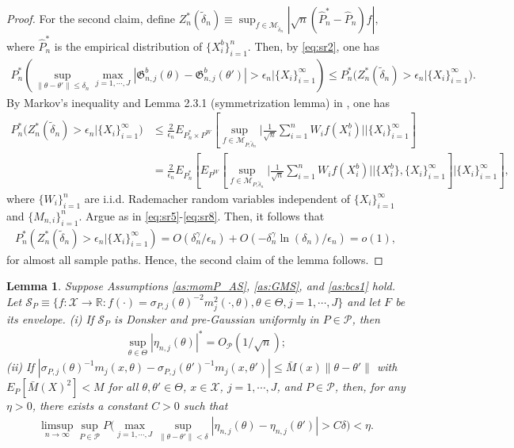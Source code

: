 \documentclass[letterpaper,11pt]{article}
\theoremstyle{myplain}
\newtheorem{lemma}{Lemma}[section]
\theoremstyle{mydefinition}
\theoremstyle{myremark}
\renewcommand{\cite}{\citet}
\numberwithin{equation}{section}
\numberwithin{figure}{section}
\begin{document}
\begin{appendices}
\begin{proof}
For the second claim, define $Z^*_n(\tilde\delta_n)\equiv \sup_{f\in\mathcal M_{\tilde\delta_n}}|\sqrt n(\hat P^*_n-\hat P_n)f|,$ where $\hat P^*_n$ is the empirical distribution of $\{X_i^b\}_{i=1}^n$. Then, by \eqref{eq:sr2}, one has
\begin{align}
P^*_n\left(\sup_{\|\theta-\theta'\|\le \delta_n}\max_{j=1,\cdots,J}|\mathfrak G^b_{n,j}(\theta)-\mathfrak G^b_{n,j}(\theta')|>\epsilon_n\Big|\{X_i\}_{i=1}^\infty\right)\le P^*_n\big(Z^*_n(\tilde\delta_n)>\epsilon_n\big|\{X_i\}_{i=1}^\infty\big).\label{eq:sr9}	
\end{align}
By Markov's inequality and Lemma 2.3.1 (symmetrization lemma) in \cite{Vaart_Wellner2000aBK}, one has
\begin{align}
P^*_n\big(Z^*_n(\tilde\delta_n)>\epsilon_n\big|\{X_i\}_{i=1}^\infty\big)&\le \frac{2}{\epsilon_n}E_{P^*_n\times P^W}\left[\sup_{f\in\mathcal M_{P,\tilde\delta_n}}\Big|\frac{1}{\sqrt n}\sum_{i=1}^nW_i f(X^b_i)\Big| \Bigg|\{X_i\}_{i=1}^\infty\right]\\
&=\frac{2}{\epsilon_n}E_{P^*_n}\left[E_{P^W}\left[\sup_{f\in\mathcal M_{P,\tilde\delta_n}}\Big| \frac{1}{\sqrt n}\sum_{i=1}^nW_i f(X^b_i)\Big| \Bigg|\{X^b_i\},\{X_i\}_{i=1}^\infty\right]\Bigg|\{X_i\}_{i=1}^\infty\right],\label{eq:sr10}
\end{align}
where $\{W_i\}_{i=1}^n$ are i.i.d. Rademacher random variables independent of $\{X_i\}_{i=1}^\infty$ and $\{M_{n,i}\}_{i=1}^n$.
Argue as in \eqref{eq:sr5}-\eqref{eq:sr8}. Then, it follows that
\begin{align*}
P^*_n(Z^*_n(\tilde\delta_n)>\epsilon_n|\{X_i\}_{i=1}^\infty)=O(\delta_n^\gamma/\epsilon_n)+O(-\delta_n^\gamma\ln(\delta_n)/\epsilon_n)=o(1),
\end{align*}
 for almost all sample paths. Hence, the second claim of the lemma follows.
\end{proof}



\begin{lemma}\label{lem:eta_rate}
Suppose Assumptions  \ref{as:momP_AS}, \ref{as:GMS}, and \ref{as:bcs1}  hold.
Let $\mathcal S_P\equiv\{f:\mathcal X\to\mathbb R:f(\cdot)=\sigma_{P,j}(\theta)^{-2}m_j^2(\cdot,\theta),\theta\in\Theta,j=1,\cdots,J\}$ and let $F$ be its envelope. 
(i) If $\mathcal S_P$ is Donsker and pre-Gaussian uniformly in $P\in\mathcal P$, then
\begin{align}
	\sup_{\theta\in\Theta}|\eta_{n,j}(\theta)|^*=O_{\mathcal P}(1/\sqrt n);
\end{align}	
(ii) If $|\sigma_{P,j}(\theta)^{-1}m_j(x,\theta)-\sigma_{P,j}(\theta')^{-1}m_j(x,\theta')|\le \bar M(x)\|\theta-\theta'\|$ with $E_P[\bar M(X)^{2}]<M$ for all $\theta,\theta'\in\Theta$, $x\in\mathcal X$, $j=1,\cdots,J$, and $P\in\mathcal P$,  then, for any $\eta>0$, there exists a constant $C>0$ such that
\begin{align}
\limsup_{n\to\infty}	\sup_{P\in\mathcal P}P\Big(\max_{j=1,\cdots,J}\sup_{\|\theta-\theta'\|<\delta}|\eta_{n,j}(\theta)-\eta_{n,j}(\theta')|>C\delta\Big)<\eta.
\end{align}
\end{lemma}


\end{appendices}
\end{document}
